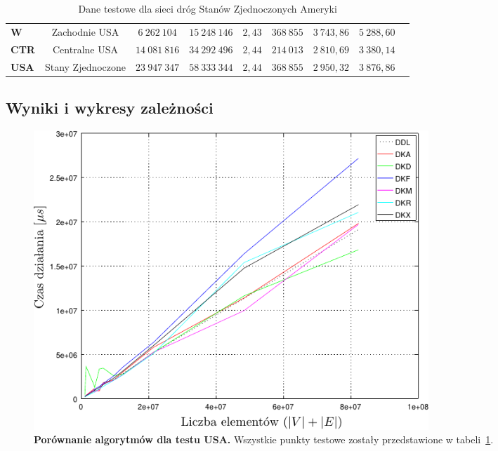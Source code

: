 \begin{table}[h]
\begin{tabular}{lcccccccc}
		\textbf{W} & Zachodnie USA & $6~262~104$ & $15~248~146$ & $2,43$ & $368~855$ & $3~743,86$ & $5~288,60$ &  \\
		\textbf{CTR} & Centralne USA & $14~081~816$ & $34~292~496$ & $2,44$ & $214~013$ & $2~810,69$ & $3~380,14$ &  \\
		\textbf{USA} & Stany Zjednoczone & $23~947~347$ & $58~333~344$ & $2,44$ & $368~855$ & $2~950,32$ & $3~876,86$ &  \\
		\hline
	\end{tabular}
	\caption{
		Dane testowe dla sieci dróg Stanów Zjednoczonych Ameryki
	}
	\label{tab:USARoad}
\end{table}



\subsection{Wyniki i wykresy zależności}



\begin{figure}[!htbp]
	\null\hfill
	\includegraphics[width=0.72\textwidth]{Chapter_IV/USA-road-d_psfrag.pdf}
	\hfill\null
	\caption{
		\textbf{Porównanie algorytmów dla testu USA.}
		Wszystkie punkty testowe zostały przedstawione w tabeli~\ref{tab:USARoad}.
		}
	\label{fig:plotUSA-road-d}
\end{figure}

